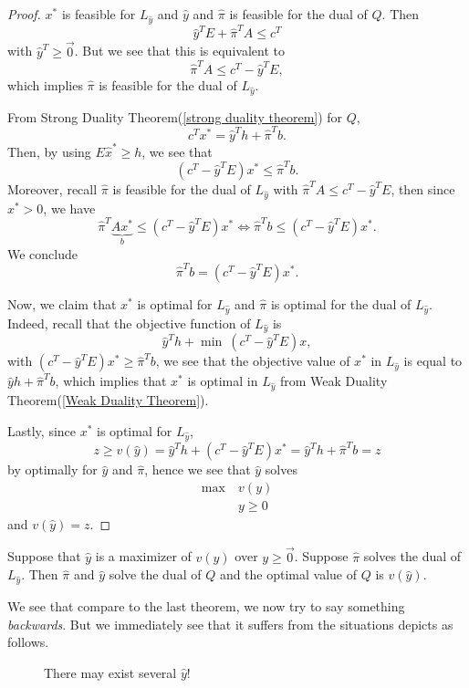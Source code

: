 \begin{proof}
	\(x^{*}\) is feasible for \(L_{\hat{y}}\) and \(\hat{y}\) and \(\hat{\pi}\) is feasible for the dual of \(Q\). Then
	\[
		\hat{y}^{T}E + \hat{\pi}^{T}A \leq c^{T}
	\]
	with \(\hat{y}^{T}\geq \vec{0}\). But we see that this is equivalent to
	\[
		\hat{\pi}^{T}A\leq c^{T} - \hat{y}^{T}E,
	\]
	which implies \(\hat{\pi}\) is feasible for the dual of \(L_{\hat{y}}\).

	From Strong Duality Theorem(\autoref{strong duality theorem}) for \(Q\),
	\[
		c^{T}x^{*} = \hat{y}^{T}h + \hat{\pi}^{T}b.
	\]
	Then, by using \(E \hat{x}^{*} \geq h\), we see that
	\[
		(c^{T} - \hat{y}^{T}E)x^{*} \leq \hat{\pi}^{T}b.
	\]
	Moreover, recall \(\hat{\pi}\) is feasible for the dual of \(L_{\hat{y}}\) with \(\hat{\pi}^{T} A \leq c^{T} - \hat{y}^{T}E\), then since \(x^{*}>0\), we have
	\[
		\hat{\pi}^{T} \underbrace{Ax^{*}}_{b} \leq (c^{T} - \hat{y}^{T}E)x^{*} \iff \hat{\pi}^{T} b \leq (c^{T} - \hat{y}^{T}E)x^{*}.
	\]
	We conclude
	\[
		\hat{\pi}^{T} b = (c^{T} - \hat{y}^{T}E)x^{*}.
	\]

	Now, we claim that \(x^{*}\) is optimal for \(L_{\hat{y}}\) and \(\hat{\pi}\) is optimal for the dual of \(L_{\hat{y}}\).
	Indeed, recall that the objective function of \(L_{\hat{y}}\) is
	\[
		\hat{y}^{T}h + \min~  (c^{T} - \hat{y}^{T}E)x,
	\]
	with \((c^{T} - \hat{y}^{T}E)x^{*} \geq \hat{\pi}^{T}b\), we see that the objective value of \(x^{*}\) in \(L_{\hat{y}}\)
	is equal to \(\hat{y}h+\hat{\pi}^{T}b \), which implies that \(x^{*}\) is optimal in \(L_{\hat{y}}\) from Weak Duality Theorem(\autoref{Weak Duality Theorem}).

	Lastly, since \(x^{*}\) is optimal for \(L_{\hat{y}}\),
	\[
		z\geq v(\hat{y})= \hat{y}^{T}h + (c^{T} - \hat{y}^{T}E)x^{*}= \hat{y}^{T}h + \hat{\pi}^{T}b = z
	\]
	by optimally for \(\hat{y}\) and \(\hat{\pi}\), hence we see that \(\hat{y}\) solves
	\begin{align*}
		\max~ & v(y)    \\
		      & y\geq 0
	\end{align*}
	and \(v(\hat{y}) = z\).
\end{proof}

\begin{theorem}
	\label{converse-lagrangian dual}
	Suppose that \(\hat{y}\) is a maximizer of \(v(y)\) over \(y\geq \vec{0}\). Suppose \(\hat{\pi}\) solves the dual of \(L_{\hat{y}}\).
	Then \(\hat{\pi}\) and \(\hat{y}\) solve the dual of \(Q\) and the optimal value of \(Q\) is \(v(\hat{y})\).
\end{theorem}
\begin{intuition}
	We see that compare to the last theorem, we now try to say something \emph{backwards}. But we immediately see that it suffers from
	the situations depicts as follows.
\end{intuition}
\begin{figure}[H]
	\centering
	\caption{There may exist several \(\hat{y} \)!}
	\label{fig:lagrangian-maximizer}
\end{figure}
